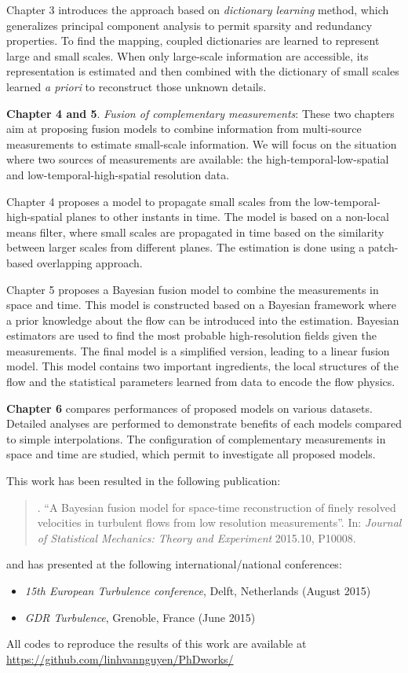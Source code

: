 Chapter 3 introduces the approach based on \textit{dictionary learning} method, which generalizes principal component analysis to permit sparsity and redundancy properties. To find the mapping, coupled dictionaries are learned to represent large and small scales. When only large-scale information are accessible, its representation is estimated and then combined with the dictionary of small scales learned \textit{a priori} to reconstruct those unknown details.

\textbf{Chapter 4 and 5}. \textit{Fusion of complementary measurements}: These two chapters aim at proposing fusion models to combine information from multi-source measurements to estimate small-scale information. We will focus on the situation where two sources of measurements are available: the high-temporal-low-spatial and low-temporal-high-spatial resolution data. 

Chapter 4 proposes a model to propagate small scales from the low-temporal-high-spatial planes to other instants in time. The model is based on a non-local means filter, where small scales are propagated in time based on the similarity between larger scales from different planes. The estimation is done using a patch-based overlapping approach.

Chapter 5 proposes a Bayesian fusion model to combine the measurements in space and time. This model is constructed based on a Bayesian framework where a prior knowledge about the flow can be introduced into the estimation. Bayesian estimators are used to find the most probable high-resolution fields given the measurements. The final model is a simplified version, leading to a linear fusion model. This model contains two important ingredients, the local structures of the flow and the statistical parameters learned from data to encode the flow physics. 
	
\textbf{Chapter 6} compares performances of proposed models on various datasets. Detailed analyses are performed to demonstrate benefits of each models compared to simple interpolations. The configuration of complementary measurements in space and time are studied, which permit to investigate all proposed models.

This work has been resulted in the following publication:
\begin{quote}
\citet{van2015bayesian}. ``A Bayesian fusion model for space-time reconstruction of finely resolved velocities in turbulent flows from low resolution measurements''. In: \emph{Journal of Statistical Mechanics: Theory and Experiment} 2015.10, P10008.
\end{quote}
and has presented at the following international/national conferences:
\begin{itemize}
	\item \emph{15th European Turbulence conference}, Delft, Netherlands (August 2015)
	\item \emph{GDR Turbulence}, Grenoble, France (June 2015)
\end{itemize}
All codes to reproduce the results of this work are available at \url{https://github.com/linhvannguyen/PhDworks/}